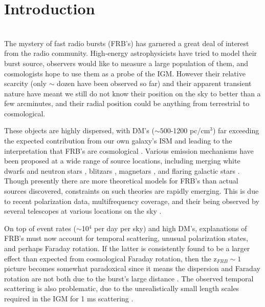 \documentclass[useAMS,usenatbib]{mn2e}
\begin{document}
\newcommand{\be}{\begin{eqnarray}}
\newcommand{\ee}{\end{eqnarray}}
\newcommand{\beq}{\begin{equation}}
\newcommand{\eeq}{\end{equation}}

\section{Introduction}
\\
The mystery of fast radio bursts (FRB's) has garnered
a great deal of interest from the radio community.
High-energy astrophysicists have tried to model their burst source, 
observers would like to measure a large population of them, and cosmologists
hope to use them as a probe of the IGM. However their relative scarcity 
(only $\sim$ dozen have been observed so far) and their apparent 
transient nature have meant we still do not know their position on the sky
to better than a few arcminutes, and their radial position could be anything
from terrestrial to cosmological.

These objects are
highly dispersed, with DM's ($\sim 500$-1200 pc/cm$^3$) far exceeding
the expected contribution from our own galaxy's ISM and leading to the
interpretation that FRB's are cosmological \citep{2007Sci...318..777L, 2013Sci...341...53T}. 
Various emission mechanisms have been proposed 
at a wide range of source locations, 
including merging white dwarfs \citep{2012ApJ...760...64M}
and neutron stars \citep{2013PASJ...65L..12T},
blitzars \citep{2014A&A...562A.137F}, 
magnetars \citep{2015arXiv150101341P, 2014MNRAS.442L...9L}, 
and flaring galactic stars \citep{2004ApJ...615..253P}.
Though presently there are more theoretical models for FRB's than actual 
sources discovered, constraints on such theories are rapidly emerging. 
This is due to recent polarization data, 
multifrequency coverage, and their being observed by several telescopes
at various locations on the sky \citep{2014ApJ...780L...2B, 2014arXiv1412.0342P}. 

On top of event rates ($\sim$10$^4$ per day per sky) 
and high DM's, explanations of FRB's must now
account for temporal scattering, unusual polarization states, 
and perhaps Faraday rotation. If the latter is consistently found 
to be a larger effect than expected from cosmological Faraday rotation, 
then the z$_{FRB} \sim 1$ picture becomes somewhat
paradoxical since it means the dispersion and Faraday rotation are not both due to
the burst's large distance \citep{2015A&A...575A.118O}. 
The observed temporal scattering is also problematic, due 
to the unrealistically small length scales required in the IGM 
for 1 ms scattering \citep{2014ApJ...785L..26L}. 
\end{document}
